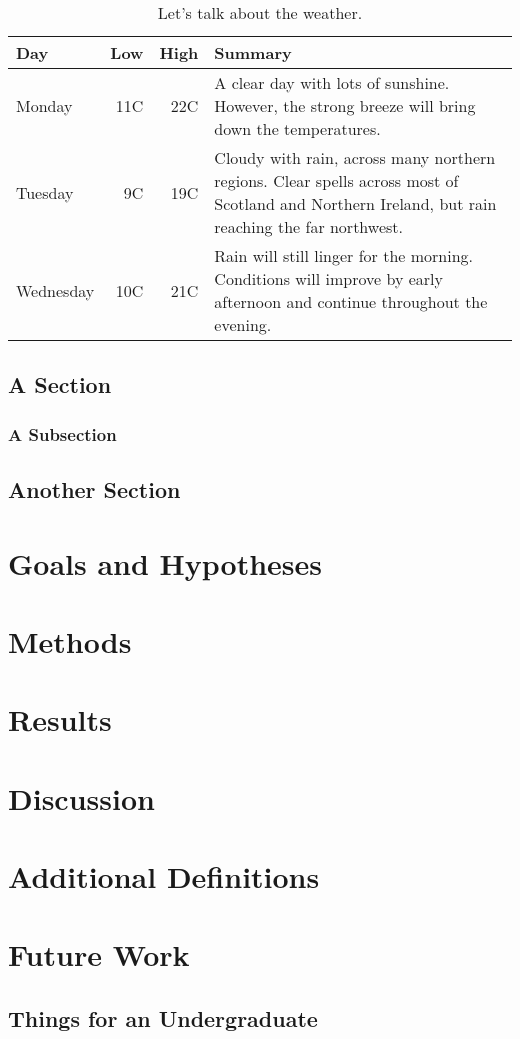 \documentclass[twoside]{mtu.thesis}
\begin{document}
\lipsum[4-6]

\begin{table}
\caption{Let's talk about the weather.}
\centering
\begin{tabular}{lrrp{10cm}}
\hline
Day & Low & High & Summary \\\hline
Monday & 11C & 22C & A clear day with lots of sunshine. However, the strong breeze will bring down the temperatures. \\
Tuesday & 9C & 19C & Cloudy with rain, across many northern regions. Clear spells across most of Scotland and Northern Ireland, but rain reaching the far northwest. \\
Wednesday & 10C & 21C & Rain will still linger for the morning. Conditions will improve by early afternoon and continue throughout the evening. \\\hline
\end{tabular}
\end{table}

\lipsum[7-10]

\section{A Section}
\lipsum[10-12]

\subsection{A Subsection}
\lipsum[13]

\section{Another Section}
\lipsum[14-20]

\chapter{Goals and Hypotheses}
\lipsum[1-18]

\chapter{Methods}
\lipsum[1-20]

\chapter{Results}
\lipsum[1-20]

\chapter{Discussion}
\lipsum[1-20]

\nocite{*}


\appendix

\chapter{Additional Definitions}
\lipsum[1-20]

\chapter{Future Work}
\lipsum[1-5]
\section{Things for an Undergraduate}
\lipsum[1-10]
\end{document}
